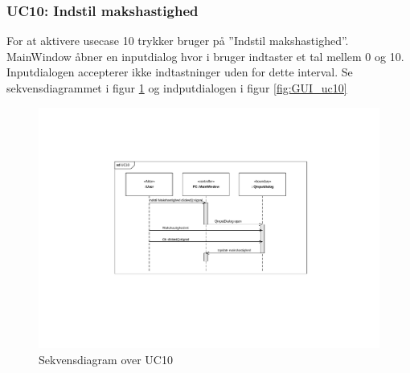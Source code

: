 \subsubsection{UC10: Indstil makshastighed}
For at aktivere usecase 10 trykker bruger på ''Indstil makshastighed''.
MainWindow åbner en inputdialog hvor i bruger indtaster et tal mellem 0 og 10. Inputdialogen accepterer ikke indtastninger uden for dette interval. Se sekvensdiagrammet i figur \ref{fig:cd_uc10} og indputdialogen i figur \ref{fig:GUI_uc10}

\begin{figure}[H]
\centering
\includegraphics[width=\textwidth* 2/3,height=\textwidth* 4/10 ]{../fig/diagrammer/pc/sd_uc10.pdf}
\caption{Sekvensdiagram over UC10}
\label{fig:cd_uc10}
\end{figure}

